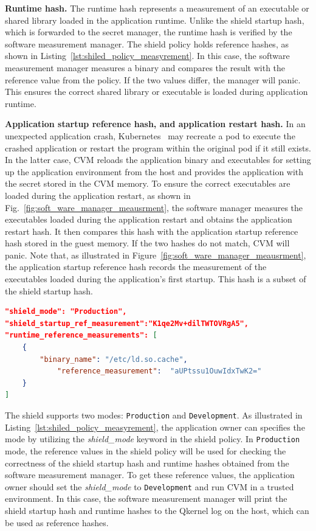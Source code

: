 \textbf{Runtime hash.} The runtime hash represents a measurement of an executable or shared library loaded in the application runtime. Unlike the shield startup hash, which is forwarded to the secret manager, the runtime hash is verified by the software measurement manager. The shield policy holds reference hashes, as shown in 
Listing~\ref{lst:shiled_policy_measyrement}. In this case, the software measurement manager measures a binary and compares the result with the reference value from the policy. If the two values differ, the manager will panic. This ensures the correct shared library or executable is loaded during application runtime.



\textbf{Application startup reference hash, and application restart hash.} In an unexpected application crash, Kubernetes~\cite*{k8s} may recreate a pod to execute the crashed application or restart the program within the original pod if it still exists. In the latter case, \acrshort{CVM} reloads the application binary and executables for setting up 
the application environment from the host and provides the application with the secret stored in the \acrshort{CVM} memory. To ensure the correct executables are loaded during the application restart,  as shown in Fig.~\ref{fig:soft_ware_manager_meausrment}, the software manager measures the executables loaded during the application restart and obtains 
the application restart hash. It then compares this hash with the application startup reference hash stored in the guest memory. If the two hashes do not match, \acrshort{CVM} will panic. Note that, as illustrated in Figure~\ref{fig:soft_ware_manager_meausrment}, the application startup reference hash records the measurement of the executables loaded during the 
application's first startup. This hash is a subset of the shield startup hash.

\begin{lstlisting}[language=json, caption= Software measurement manager's configuration in the shield policy, label={lst:shiled_policy_measyrement}]
"shield_mode": "Production",
"shield_startup_ref_measurement":"K1qe2Mv+dilTWTOVRgA5",
"runtime_reference_measurements": [
    {
        "binary_name": "/etc/ld.so.cache",
            "reference_measurement":  "aUPtssu1OuwIdxTwK2="
    }   
]
\end{lstlisting}

The shield supports two modes: \texttt{Production} and \texttt{Development}. As illustrated in Listing~\ref{lst:shiled_policy_measyrement}, the application owner can specifies the mode by utilizing the \emph{shield\_mode} keyword in the shield policy. In \texttt{Production} mode, the reference 
values in the shield policy will be used for checking the correctness of the shield startup hash and runtime hashes obtained from the software measurement manager. To get these reference values, the application owner should set the \emph{shield\_mode} to \texttt{Development} and run 
\acrshort{CVM} in a trusted environment. In this case, the software measurement manager will print the shield startup hash and runtime hashes to the Qkernel log on the host, which can be used as reference hashes.


